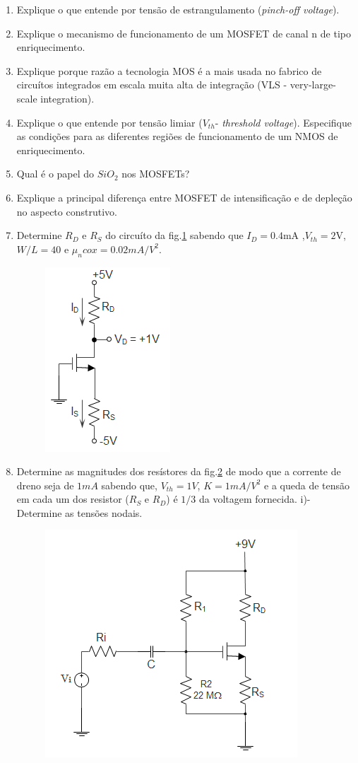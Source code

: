 \documentclass[12pt,a4paper,titlepage]{report}
\begin{document}
\begin{enumerate}
\item Explique o que entende por tens\~ao de estrangulamento (\textit{pinch-off voltage}).
\item Explique o mecanismo de funcionamento de um MOSFET de canal n de tipo enriquecimento.
\item Explique porque raz\~ao a tecnologia MOS \'e a mais usada no fabrico de circu\'itos integrados em escala muita alta de integra\c c\~ao (VLS - very-large-scale integration).
\item Explique o que entende por tens\~ao limiar ($V_{th}$- \textit{threshold voltage}). Especifique as condi\c c\~oes para as diferentes regi\~oes de funcionamento de um NMOS de enriquecimento.
\item Qual \'e o papel do $SiO_2$ nos MOSFETs?
\item Explique a principal diferença entre MOSFET de  intensificação e de depleção no aspecto construtivo.
\item Determine $R_D$ e $R_S$ do circu\'ito da fig.\ref{a} sabendo que  $I_D=0.4$mA  ,$V_{th}=2$V, $W/L=40$ e $\mu_n cox =0.02mA/V^{2}$.
\begin{figure}[H]
\centering
\includegraphics[scale=0.7]{MOSFET1}
\caption{}
\label{a}
\end{figure}

\item Determine as magnitudes dos res\'istores da fig.\ref{a1} de modo que a corrente de dreno seja de $1mA$ sabendo que, $V_{th}= 1V$, $K=1mA/V^2$ e a queda de tens\~ao em cada um dos resistor ($R_S$ e $R_D$) \'e $1/3$ da voltagem fornecida. i)- Determine as tens\~oes nodais.
 
\begin{figure}[H]
\centering
\includegraphics[scale=0.7]{MOSFET2}
\caption{}
\label{a1}
\end{figure}



\end{enumerate}
\end{document}
